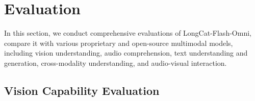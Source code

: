 \documentclass{article}
\newcommand{\longcat}{LongCat-Flash-Omni\xspace}
\begin{document}




\section{Evaluation} %
\label{sec5:eval}

In this section, we conduct comprehensive evaluations of \longcat, compare it with various proprietary and open-source multimodal models, including vision understanding, audio comprehension, text understanding and generation, cross-modality understanding, and audio-visual interaction.

\subsection{Vision Capability Evaluation}
\end{document}
